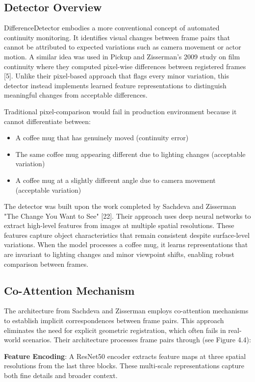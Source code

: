 \subsection{Detector Overview}
DifferenceDetector embodies a more conventional concept of automated continuity monitoring. It identifies visual changes between frame pairs that cannot be attributed to expected variations such as camera movement or actor motion. A similar idea was used in Pickup and Zisserman's 2009 study on film continuity where they computed pixel-wise differences between registered frames [5]. Unlike their pixel-based approach that flags every minor variation, this detector instead implements learned feature representations to distinguish meaningful changes from acceptable differences.

Traditional pixel-comparison would fail in production environment because it cannot differentiate between:
\begin{itemize}
\item A coffee mug that has genuinely moved (continuity error)
\item The same coffee mug appearing different due to lighting changes (acceptable variation)
\item A coffee mug at a slightly different angle due to camera movement (acceptable variation)
\end{itemize}

The detector was built upon the work completed by Sachdeva and Zisserman "The Change You Want to See" [22]. Their approach uses deep neural networks to extract high-level features from images at multiple spatial resolutions. These features capture object characteristics that remain consistent despite surface-level variations. When the model processes a coffee mug, it learns representations that are invariant to lighting changes and minor viewpoint shifts, enabling robust comparison between frames.

\subsection{Co-Attention Mechanism}
The architecture from Sachdeva and Zisserman employs co-attention mechanisms to establish implicit correspondences between frame pairs. This approach eliminates the need for explicit geometric registration, which often fails in real-world scenarios. Their architecture processes frame pairs through (see Figure 4.4):

\textbf{Feature Encoding}: A ResNet50 encoder extracts feature maps at three spatial resolutions from the last three blocks. These multi-scale representations capture both fine details and broader context.

